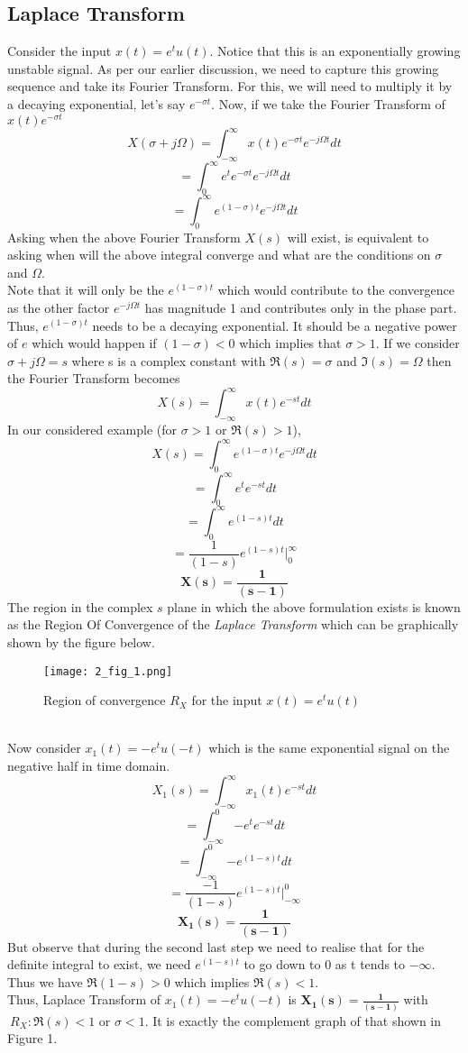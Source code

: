 \subsection{Laplace Transform}
Consider the input $x(t) = e^{t}u(t)$. Notice that this is an exponentially growing unstable signal. As per our earlier discussion, we need to capture this growing sequence and take its Fourier Transform. For this, we will need to multiply it by a decaying exponential, let's say $e^{-\sigma t}$. Now, if we take the Fourier Transform of $x(t)e^{-\sigma t}$
\[
	X(\sigma + j\Omega) = \int_{-\infty}^{\infty}{x(t)e^{-\sigma t}e^{-j\Omega t}dt}
\]\[
	 = \int_{0}^{\infty}{e^{t}e^{-\sigma t}e^{-j\Omega t}dt}
\]\[
	 = \int_{0}^{\infty}{e^{(1-\sigma)t}e^{-j\Omega t}dt}
\]
Asking when the above Fourier Transform $X(s)$ will exist, is equivalent to asking when will the above integral converge and what are the conditions on $\sigma$ and $\Omega$.\\
Note that it will only be the $e^{(1-\sigma)t}$ which would contribute to the convergence as the other factor $e^{-j\Omega t}$ has magnitude 1 and contributes only in the phase part. Thus, $e^{(1-\sigma)t}$ needs to be a decaying exponential. It should be a negative power of $e$ which would happen if $(1-\sigma) < 0$ which implies that $\sigma > 1$. If we consider $\sigma + j\Omega = s$ where s is a complex constant with $\Re(s) = \sigma$ and $\Im(s) = \Omega$ then the Fourier Transform becomes 
\[
	X(s) = \int_{-\infty}^{\infty}{x(t)e^{-st}dt}
\]
In our considered example (for $\sigma > 1$ or $\Re(s) >1$),
\[
	X(s) = \int_{0}^{\infty}{e^{(1-\sigma)t}e^{-j\Omega t}dt}
\]\[
	 = \int_{0}^{\infty}{e^{t}e^{-st}dt}
\]\[
	 = \int_{0}^{\infty}{e^{(1-s)t}dt}
\]\[
	 = \frac{1}{(1-s)}e^{(1-s)t}\Big|_0^{\infty}
\]\[
	\mathbf{X(s) = \frac{1}{(s - 1)}}
\]
The region in the complex $s$ plane in which the above formulation exists is known as the Region Of Convergence of the \textit{Laplace Transform} which can be graphically shown by the figure below.
\begin{figure}[h!]
\begin{center}
\texttt{[image: 2\_fig\_1.png]}
\end{center}
\caption{Region of convergence $R_X$ for the input  $x(t) = e^{t}u(t)$}
\end{figure}\\
Now consider $x_1(t) = -e^{t}u(-t)$ which is the same exponential signal on the negative half in time domain.
\[
	X_1(s) = \int_{-\infty}^{\infty}{x_1(t)e^{-st}dt}
\]\[
	 = \int_{-\infty}^{0}{-e^{t}e^{-st} dt}
\]\[
	 = \int_{-\infty}^{0}{-e^{(1-s)t} dt}
\]\[
	 = \frac{-1}{(1 - s)}e^{(1-s)t}\Big|_{-\infty}^{0}
\]\[
	\mathbf{X_1(s) = \frac{1}{(s - 1)}}
\]
But observe that during the second last step we need to realise that for the definite integral to exist, we need $e^{(1-s)t}$ to go down to 0 as t tends to ${-\infty}$. Thus we have $\Re(1-s) > 0$ which implies $\Re(s) < 1$. \\
Thus, Laplace Transform of $x_1(t) = -e^{t}u(-t)$ is $\mathbf{X_1(s) = \frac{1}{(s - 1)}}$ with $\ R_X: \Re(s) < 1$ or $\sigma < 1$. It is exactly the complement graph of that shown in Figure 1.

